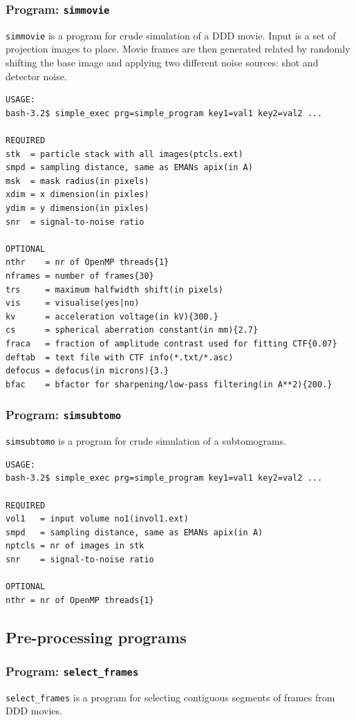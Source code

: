 \documentclass[a4paper,11pt]{article}
\newcommand{\prgname}[1]{\textcolor{NavyBlue}{\texttt{#1}}}
\begin{document}
\subsubsection{Program: \prgname{simmovie}}
\label{simmovie}
\prgname{simmovie} is a program for crude simulation of a DDD movie. Input is a set of projection images to place. Movie frames are then generated related by randomly shifting the base image and applying two different noise sources: shot and detector noise.

\begin{verbatim}
USAGE:
bash-3.2$ simple_exec prg=simple_program key1=val1 key2=val2 ...

REQUIRED
stk  = particle stack with all images(ptcls.ext)
smpd = sampling distance, same as EMANs apix(in A)
msk  = mask radius(in pixels)
xdim = x dimension(in pixles)
ydim = y dimension(in pixles)
snr  = signal-to-noise ratio

OPTIONAL
nthr    = nr of OpenMP threads{1}
nframes = number of frames{30}
trs     = maximum halfwidth shift(in pixels)
vis     = visualise(yes|no)
kv      = acceleration voltage(in kV){300.}
cs      = spherical aberration constant(in mm){2.7}
fraca   = fraction of amplitude contrast used for fitting CTF{0.07}
deftab  = text file with CTF info(*.txt/*.asc)
defocus = defocus(in microns){3.}
bfac    = bfactor for sharpening/low-pass filtering(in A**2){200.}
\end{verbatim}

\subsubsection{Program: \prgname{simsubtomo}}
\label{simsubtomo}
\prgname{simsubtomo} is a program for crude simulation of a subtomograms.

\begin{verbatim}
USAGE:
bash-3.2$ simple_exec prg=simple_program key1=val1 key2=val2 ...

REQUIRED
vol1   = input volume no1(invol1.ext)
smpd   = sampling distance, same as EMANs apix(in A)
nptcls = nr of images in stk
snr    = signal-to-noise ratio

OPTIONAL
nthr = nr of OpenMP threads{1}
\end{verbatim}

\subsection{Pre-processing programs}

\subsubsection{Program: \prgname{select\_frames}}
\label{select_frames}
\prgname{select\_frames} is a program for selecting contiguous segments of frames from DDD movies.
\end{document}
